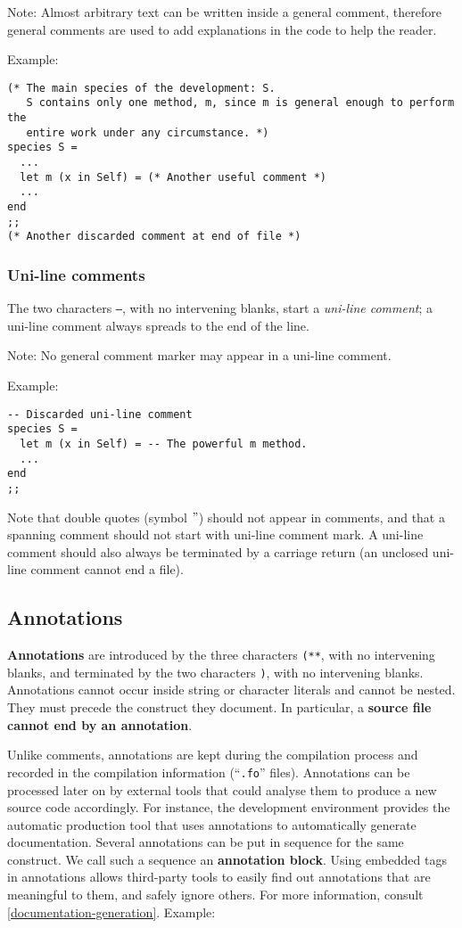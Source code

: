 Note: Almost arbitrary text can be written inside a general comment, therefore
general comments are used to add explanations in the code to help the reader.

Example:

{\scriptsize
\begin{lstlisting}
(* The main species of the development: S.
   S contains only one method, m, since m is general enough to perform the
   entire work under any circumstance. *)
species S =
  ...
  let m (x in Self) = (* Another useful comment *)
  ...
end
;;
(* Another discarded comment at end of file *)
\end{lstlisting}
}

\subsubsection{Uni-line comments}

The two characters {\tt --}, with no intervening blanks, start a {\em uni-line
comment}; a uni-line comment always spreads to the end of the line.

Note: No general comment marker may appear in a uni-line comment.

Example:

{\scriptsize
\begin{lstlisting}
-- Discarded uni-line comment
species S =
  let m (x in Self) = -- The powerful m method.
  ...
end
;;
\end{lstlisting}
}

Note that double quotes (symbol $"$) should not appear in comments, and that
a spanning comment should not start with uni-line comment mark. A uni-line
comment should also always be terminated by a carriage return (an unclosed
uni-line comment cannot end a file).

\subsection{Annotations}
\label{annotation}
{\bf Annotations} are introduced by the three characters {\tt (**},
with no intervening blanks, and terminated by the two characters
{\tt *)}, with no intervening blanks.
Annotations cannot occur inside string or character literals and
cannot be nested. They must precede the construct they document.
In particular, a {\bf source file cannot end by an annotation}.

Unlike comments, annotations are kept during the compilation process
and recorded in the compilation information (``{\tt .fo}'' files). Annotations can
be processed later on by external tools that could analyse them to
produce a new {\focal} source code accordingly.
For instance, the {\focal} development environment provides the {\focdoc}
automatic production tool that uses annotations to automatically generate
documentation.
Several annotations can be put in sequence for the same construct. We call
such a sequence an {\bf annotation block}.
Using embedded tags in annotations allows third-party tools to easily find
out annotations that are meaningful to them, and safely ignore others.
For more information, consult
\ref{documentation-generation}.
Example:

